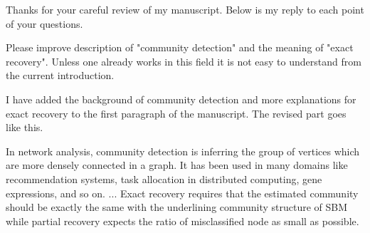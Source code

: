 \documentclass[answers]{exam}
\begin{document}
	\pagestyle{empty}
	Thanks for your careful review of my manuscript. Below is my reply to each point of your questions.
\begin{questions}
\question Please improve description of "community detection" and the meaning of "exact recovery". Unless one already works in this field it is not easy to understand from the current introduction.
\begin{solution}
	I have added the background of community detection and more explanations for exact recovery to the first paragraph of the manuscript.
	The revised part goes like this.

	In network analysis, community detection is inferring the group of vertices which
	are more densely connected in a graph. It has been used in many domains like recommendation systems,
	task allocation in distributed computing, gene expressions, and so on. ... Exact recovery requires that the estimated community should be exactly
	the same with the underlining community structure of SBM while partial recovery expects the ratio of misclassified node as small as possible.



\end{solution}
\end{questions}
\end{document}
